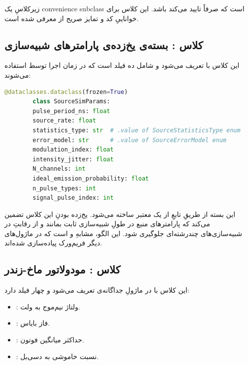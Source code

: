 زیرکلاسِ  یک convenience subclass است که صرفاً تایید می‌کند  باشد. این کلاس برای خواناییِ کد و تمایز صریح از  معرفی شده است.

\subsection{کلاس : بسته‌ی یخ‌زده‌ی پارامترهای شبیه‌سازی}

این کلاس با  تعریف می‌شود و شامل ده فیلد است که در زمان اجرا توسط  استفاده می‌شوند:

\begin{LTR}
	\begin{lstlisting}[language=Python]
		@dataclasses.dataclass(frozen=True)
		class SourceSimParams:
		pulse_period_ns: float
		source_rate: float
		statistics_type: str  # .value of SourceStatisticsType enum
		error_model: str      # .value of SourceErrorModel enum
		modulation_index: float
		intensity_jitter: float
		N_channels: int
		ideal_emission_probability: float
		n_pulse_types: int
		signal_pulse_index: int
	\end{lstlisting}
\end{LTR}

این بسته از طریقِ تابعِ  از یک  معتبر ساخته می‌شود. یخ‌زده بودنِ این کلاس تضمین می‌کند که پارامترهای منبع در طولِ شبیه‌سازی ثابت بمانند و از رقابتِ  در شبیه‌سازی‌های چندرشته‌ای جلوگیری شود. این الگو، مشابهِ  و  است که در ماژول‌های دیگر فریم‌ورک پیاده‌سازی شده‌اند.

\subsection{کلاس : مودولاتور ماخ-زندر}

این کلاس با  در ماژولِ جداگانه‌ی  تعریف می‌شود و چهار فیلد دارد:
\begin{itemize}
	\item {}: ولتاژ نیم‌موج به ولت.
	\item {}: فاز بایاس.
	\item {}: حداکثر میانگین فوتون.
	\item {}: نسبت خاموشی به دسی‌بل.
\end{itemize}

